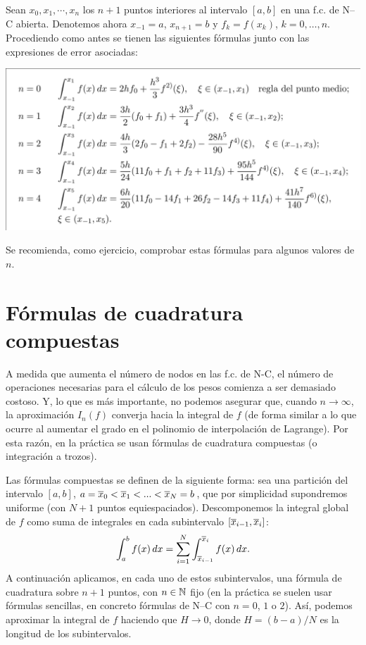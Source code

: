 \begin{example}
  \label{ex:fc-NC-abiertas}
  Sean $x_0,x_1,\cdots,x_n$ los $n+1$ puntos interiores al intervalo
  $[a,b]$ en una f.c. de N--C abierta. Denotemos ahora $x_{-1}=a$,
  $x_{n+1}=b$ y $f_k=f(x_k)$, $k=0,\dots,n$. Procediendo como antes
  se tienen las siguientes fórmulas junto con las expresiones de error
  asociadas:
  \begin{center}
    \includegraphics[width=0.95\linewidth]{tema3/formulas-nc-abiertas}
  \end{center}
  Se recomienda, como ejercicio, comprobar estas fórmulas para algunos
  valores de $n$.
\end{example}

\section{Fórmulas de cuadratura compuestas}
\label{sec:fc-compuestas}

A medida que aumenta el número de nodos en las f.c. de N-C, el número
de operaciones necesarias para el cálculo de los pesos comienza a ser
demasiado costoso. Y, lo que es más importante, no podemos asegurar
que, cuando $n\to\infty$, la aproximación $I_n(f)$ converja hacia la
integral de $f$ (de forma similar a lo que ocurre al
aumentar el grado en el polinomio de interpolación de Lagrange). Por
esta razón, en la práctica se usan fórmulas de cuadratura
compuestas (o integración a trozos).

Las fórmulas compuestas se definen de la siguiente forma: sea una
partición del intervalo $[a,b]$, $a=\overline x_0<\overline x_1<...<\overline x_N=b$, que por
simplicidad supondremos uniforme (con $N+1$ puntos
equiespaciados).  Descomponemos
la integral global de $f$ como suma de integrales en cada subintervalo
$[\overline x_{i-1},\overline x_i]$:
\begin{equation*}
  \int_a^b f(x)\,dx = \sum_{i=1}^N \int_{\overline x_{i-1}}^{\overline x_i}f(x)\,dx.
\end{equation*}
A continuación aplicamos, en cada uno de estos subintervalos, una
fórmula de cuadratura sobre $n+1$ puntos, con $n\in\operatorname{{\mathbb N}}$ fijo (en la
práctica se suelen usar fórmulas sencillas, en concreto fórmulas de
N--C con $n=0$, $1$ o $2$). Así, podemos aproximar la integral de $f$
haciendo que $H\to 0$, donde $H=(b-a)/N$ es la longitud de
los subintervalos.

